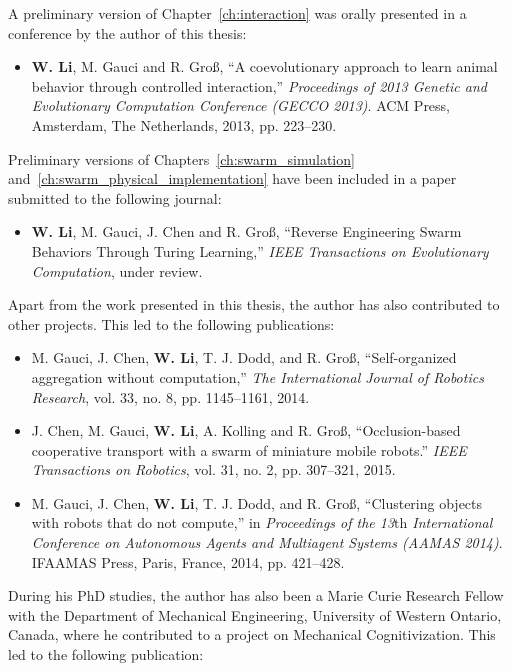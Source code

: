 A preliminary version of Chapter~\ref{ch:interaction} was orally presented in a conference by the author of this thesis:
\begin{itemize}
%
\item \textbf{W. Li}, M. Gauci and R. Gro{\ss}, ``A coevolutionary approach to learn animal behavior through controlled interaction,'' \textit{Proceedings of 2013 Genetic and Evolutionary Computation Conference (GECCO 2013)}. ACM Press, Amsterdam, The Netherlands, 2013, pp. 223--230.
%
\end{itemize}

Preliminary versions of Chapters~\ref{ch:swarm_simulation} and~\ref{ch:swarm_physical_implementation} have been included in a paper submitted to the following journal:
\begin{itemize}
%
\item \textbf{W. Li}, M. Gauci, J. Chen and R. Gro{\ss}, ``Reverse Engineering Swarm Behaviors Through Turing Learning,'' \textit{IEEE Transactions on Evolutionary Computation}, under review.
%
\end{itemize}

Apart from the work presented in this thesis, the author has also contributed to other projects. This led to the following publications:

\begin{itemize}
%
\item M. Gauci, J. Chen, \textbf{W. Li}, T. J. Dodd, and R. Gro{\ss}, ``Self-organized aggregation without computation,'' \textit{The International Journal of Robotics Research}, vol. 33, no. 8, pp. 1145--1161, 2014.
%
\item J. Chen, M. Gauci, \textbf{W. Li}, A. Kolling and R. Gro{\ss}, ``Occlusion-based cooperative transport with a swarm of miniature mobile robots.''\textit{ IEEE Transactions on Robotics}, vol. 31, no. 2, pp. 307--321, 2015.
%
\item M. Gauci, J. Chen, \textbf{W. Li}, T. J. Dodd, and R. Gro{\ss}, ``Clustering objects with robots that do not compute,'' in \textit{Proceedings of the 13${\textrm{th}}$ International Conference on Autonomous Agents and Multiagent Systems (AAMAS 2014)}. IFAAMAS Press, Paris, France, 2014, pp. 421--428.
%
\end{itemize}

During his PhD studies, the author has also been a Marie Curie Research Fellow with the Department of Mechanical Engineering, University of Western Ontario, Canada, where he contributed to a project on Mechanical Cognitivization. This led to the following publication:

